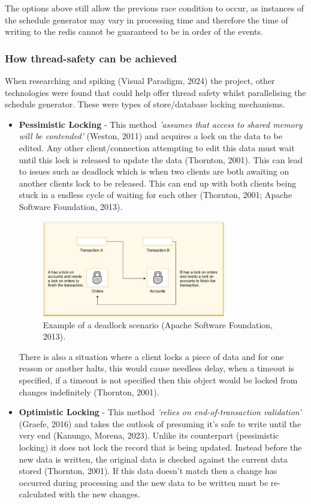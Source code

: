   The options above still allow the previous race condition to occur, as instances of the schedule generator may vary in processing time and therefore the 
  time of writing to the redis cannot be guaranteed to be in order of the events.

  \subsubsection{How thread-safety can be achieved}
  When researching and spiking (Visual Paradigm, 2024) the project, other technologies were found that could help offer thread safety whilst parallelising
  the schedule generator. These were types of store/database locking mechanisms.

  \begin{itemize}
    \item \textbf{Pessimistic Locking} - This method \textit{'assumes that access to shared memory will be contended'} (Weston, 2011) and
    acquires a lock on the data to be edited. Any other client/connection attempting to edit this data must wait until this lock is released to update
    the data (Thornton, 2001). This can lead to issues such as deadlock which is when two clients are both awaiting on another clients lock to 
    be released. This can end up with both clients being stuck in a endless cycle of waiting for each other (Thornton, 2001; Apache Software Foundation, 2013).

    \begin{figure}[H]
      \centering
      \includegraphics[width=8cm]{assets/deadlock.png}
      \caption{Example of a deadlock scenario (Apache Software Foundation, 2013).}
      \label{fig:deadlock}
    \end{figure}

    There is also a situation where a client locks a piece of data and for one reason or another halts, this would cause needless delay, when a timeout is 
    specified, if a timeout is not specified then this object would be locked from changes indefinitely (Thornton, 2001).

    \item \textbf{Optimistic Locking} - This method \textit{'relies on end-of-transaction validation'} (Graefe, 2016) and takes the outlook of presuming
    it's safe to write until the very end (Kanungo, Morena, 2023). Unlike its counterpart (pessimistic locking) it does not lock the record that is 
    being updated. Instead before the new data is written, the original data is checked against the current data stored (Thornton, 2001). If this data doesn't
    match then a change has occurred during processing and the new data to be written must be re-calculated with the new changes.


\end{itemize}
